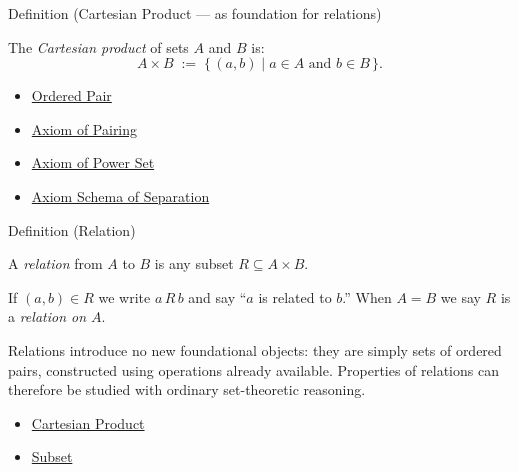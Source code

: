 \begin{definitionbox}{Definition (Cartesian Product — as foundation for relations)}
\begin{definition}\label{def:cartesian-product-rel}
The \emph{Cartesian product} of sets $A$ and $B$ is:
\[
A \times B
\;:=\;
\{\, (a,b) \mid a \in A \text{ and } b \in B \,\}.
\]
\end{definition}
\end{definitionbox}

\begin{dependencies}
\begin{itemize}
  \item \hyperref[def:ordered-pair]{Ordered Pair}
  \item \hyperref[ax:pairing]{Axiom of Pairing}
  \item \hyperref[ax:power-set]{Axiom of Power Set}
  \item \hyperref[ax:separation]{Axiom Schema of Separation}
\end{itemize}
\end{dependencies}

\begin{definitionbox}{Definition (Relation)}
\begin{definition}[Relation]\label{def:relation}
A \emph{relation} from $A$ to $B$ is any subset $R \subseteq A \times B$.

If $(a,b) \in R$ we write $a \, R \, b$ and say ``$a$ is related to $b$.''
When $A = B$ we say $R$ is a \emph{relation on $A$}.
\end{definition}
\end{definitionbox}

\begin{remark*}
Relations introduce no new foundational objects: they are simply sets of
ordered pairs, constructed using operations already available. Properties of
relations can therefore be studied with ordinary set-theoretic reasoning.
\end{remark*}

\begin{dependencies}
\begin{itemize}
  \item \hyperref[def:cartesian-product-rel]{Cartesian Product}
  \item \hyperref[def:subset]{Subset}
\end{itemize}
\end{dependencies}
